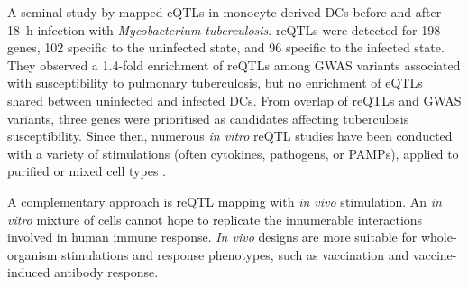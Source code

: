 \begin{outline}
A seminal study by \textcite{barreiro2012DecipheringGeneticArchitecture} mapped \glspl{eQTL} in monocyte-derived \glspl{DC} before and after \SI{18}{\hour} infection with \textit{Mycobacterium tuberculosis}.
\glspl{reQTL} were detected for 198 genes, 102 specific to the uninfected state, and 96 specific to the infected state. 
They observed a 1.4-fold enrichment of \glspl{reQTL} among \gls{GWAS} variants associated with susceptibility to pulmonary tuberculosis,
but no enrichment of \glspl{eQTL} shared between uninfected and infected \glspl{DC}.
From overlap of \glspl{reQTL} and \gls{GWAS} variants,
three genes were prioritised as candidates affecting tuberculosis susceptibility.
Since then, numerous \textit{in vitro} \gls{reQTL} studies have been conducted with a variety of stimulations (often cytokines, pathogens, or \glspl{PAMP}),
applied to purified \autocite{fairfax2014InnateImmuneActivity,kim2014CharacterizingGeneticBasis,hu2014RegulationGeneExpression,lee2014CommonGeneticVariants,caliskan2015HostGeneticVariation,quach2016GeneticAdaptationNeandertal,kim-hellmuth2017GeneticRegulatoryEffects,alasoo2018SharedGeneticEffects,gate2018GeneticDeterminantsCoaccessible,schmiedel2018ImpactGeneticPolymorphisms,alasoo2019GeneticEffectsPromoter,calderon2019LandscapeStimulationresponsiveChromatin,devries2020IntegratingGWASBulk,huang2020NeonatalGeneticsGene}
or mixed cell types \autocite{caliskan2015HostGeneticVariation,manry2017DecipheringGeneticControl}.

A complementary approach is \gls{reQTL} mapping with \textit{in vivo} stimulation.
An \textit{in vitro} mixture of cells cannot hope to replicate the innumerable interactions involved in human immune response.
\textit{In vivo} designs are more suitable for whole-organism stimulations and response phenotypes,
such as vaccination and vaccine-induced antibody response.


\end{outline}
